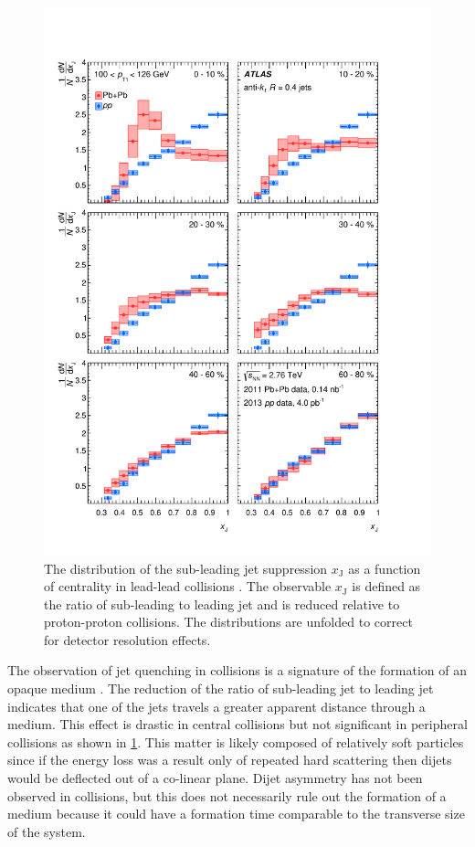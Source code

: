 \begin{figure}[t]
  \includegraphics{dijet_asym.pdf}
  \caption{The distribution of the sub-leading jet suppression $x_\textrm{J}$ as a function of centrality in lead-lead collisions \cite{HION-2012-11}. The observable $x_\textrm{J}$ is defined as the ratio of sub-leading to leading jet \pt and is reduced relative to proton-proton collisions. The distributions are unfolded to correct for detector resolution effects.}
  \label{fig:dijet_asym}
\end{figure}

The observation of jet quenching in \PbPb collisions is a signature of the formation of an opaque medium \cite{HION-2012-11}.
The reduction of the ratio of sub-leading jet \pt to leading jet \pt indicates that one of the jets travels a greater apparent distance through a medium.
This effect is drastic in central collisions but not significant in peripheral collisions as shown in \cref{fig:dijet_asym}.
This matter is likely composed of relatively soft particles since if the energy loss was a result only of repeated hard scattering then dijets would be deflected out of a co-linear plane.
Dijet asymmetry has not been observed in \pA collisions, but this does not necessarily rule out the formation of a medium because it could have a formation time comparable to the transverse size of the system.

